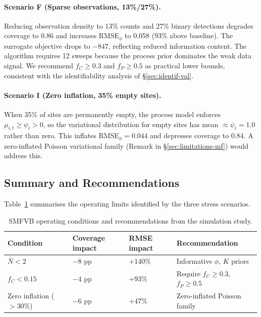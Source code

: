 \documentclass[review,12pt]{elsarticle}
\theoremstyle{definition}
\begin{document}
\paragraph{Scenario F (Sparse observations, 13\%/27\%).}
Reducing observation density to 13\% counts and 27\% binary detections
degrades coverage to 0.86 and increases RMSE$_\phi$ to 0.058 (93\% above
baseline).  The surrogate objective drops to $-847$, reflecting reduced
information content.  The algorithm requires 12 sweeps because the process
prior dominates the weak data signal.  We recommend $f_C\ge0.3$ and
$f_P\ge0.5$ as practical lower bounds, consistent with the identifiability
analysis of \S\ref{sec:identif-val}.

\paragraph{Scenario I (Zero inflation, 35\% empty sites).}
When 35\% of sites are permanently empty, the process model enforces
$\mu_{i,t}\ge\psi_i>0$, so the variational distribution for empty sites
has mean $\approx\psi_i=1.0$ rather than zero.  This inflates
RMSE$_\phi=0.044$ and depresses coverage to 0.84.  A zero-inflated Poisson
variational family (Remark in \S\ref{sec:limitations-mf}) would address this.


\subsection{Summary and Recommendations}
\label{sec:sim-summary}

Table~\ref{tab:recommendations} summarises the operating limits identified by
the three stress scenarios.

\begin{table}[ht]
\centering
\small
\caption{SMFVB operating conditions and recommendations from the simulation study.}
\label{tab:recommendations}
\begin{tabular}{llll}
\toprule
Condition & Coverage impact & RMSE impact & Recommendation \\
\midrule
$\bar N<2$               & $-8$ pp  & $+140\%$ & Informative $\phi$, $K$ priors \\
$f_C<0.15$               & $-4$ pp  & $+93\%$  & Require $f_C\ge0.3$, $f_P\ge0.5$ \\
Zero inflation ($>30\%$) & $-6$ pp  & $+47\%$  & Zero-inflated Poisson family \\
\bottomrule
\end{tabular}
\end{table}
\end{document}
